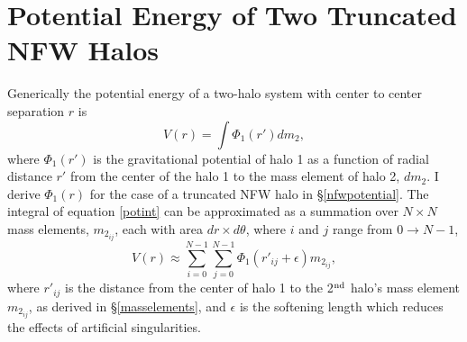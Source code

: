 \documentclass[12pt]{emulateapj}
\begin{document}
\clearpage

\appendix
%
% 
%
%
%
\section{Potential Energy of Two Truncated NFW Halos}\label{potentialsec}

Generically the potential energy of a two-halo system with center to center separation $r$ is 
\begin{equation}
V(r) = \int \Phi_1(r') dm_2,
\label{potint}
\end{equation}
where $\Phi_1(r')$ is the gravitational potential of halo 1 as a function of radial distance $r'$ from the center of the halo 1 to the mass element of halo 2, $dm_2$.  
I derive $\Phi_1(r)$ for the case of a truncated NFW halo in \S \ref{nfwpotential}.
The integral of equation \ref{potint} can be approximated as a summation over $N \times N$ mass elements, $m_{2_{ij}}$, each with area $dr\times d\theta$, where $i$ and $j$ range from $0 \rightarrow N-1$,
\begin{displaymath}
V(r) \approx \sum_{i=0}^{N-1}\sum_{j=0}^{N-1} \Phi_1(r'_{ij}+\epsilon) m_{2_{ij}},
\end{displaymath}
where $r'_{ij}$ is the distance from the center of halo 1 to the 2$^{\rm nd}$ halo's mass element $m_{2_{ij}}$, as derived in \S\ref{masselements}, and $\epsilon$ is the softening length which reduces the effects of artificial singularities.
\end{document}
